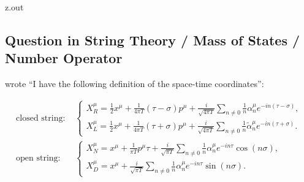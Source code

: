 \MyIO


\begin{VerbatimOut}{z.out}
\subsection{Question in String Theory / Mass of States / Number Operator}


\textcite{yourlazyphysicist2017} wrote
``I have the following definition of the space-time coordinates'':

\newcommand{\fpt}{{4\pi T}}
\newcommand{\oh}{\frac12}
\newcommand{\snnz}{\sum_{n\ne0}}
\newcommand{\tms}{\tau - \sigma}
\newcommand{\tps}{\tau + \sigma}
\begin{align}
    \text{closed string: }&
        \begin{cases}
            \displaystyle
            X^\mu_R
                = \oh x^\mu
                + \frac1\fpt (\tms) p^\mu
                + \frac i{\sqrt\fpt} \snnz \frac1n \alpha^\mu_n e^{-in(\tms)},\\
            \displaystyle
            X^\mu_L
                = \oh x^\mu
                + \frac1\fpt (\tps) p^\mu
                + \frac i{\sqrt\fpt} \snnz \frac1n \tilde\alpha^\mu_n e^{-in(\tps)}.
        \end{cases}\\[6pt]
    \text{open string: }&
        \begin{cases}
            \displaystyle
            X^\mu_N
                = x^\mu
                + \frac1{\pi T}p^\mu\tau
                + \frac i{\sqrt{\pi T}} \snnz \frac1n \alpha^\mu_n e^{-in\tau} \cos(n\sigma),\\
            \displaystyle
            X^\mu_D
                = x^\mu
                + \frac i{\sqrt{\pi T}} \snnz \frac1n \alpha^\mu_n e^{-in\tau} \sin(n\sigma).
        \end{cases}
\end{align}
\end{VerbatimOut}

\MyIO




